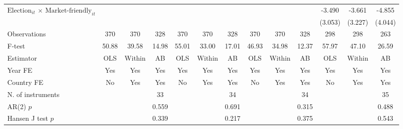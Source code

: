 \begin{longtable}{m{4.5cm}*{12}{c}}
\multirow{2}{4.5cm}{$\text{Election}_{it}$ $\times$ $\text{Market-friendly}_{it}$}&               &               &               &               &               &               &               &               &               &      -3.490   &      -3.661   &      -4.855   \\
                    &               &               &               &               &               &               &               &               &               &     (3.053)   &     (3.227)   &     (4.044)   \\
\midrule
Observations        &         370   &         370   &         328   &         370   &         370   &         328   &         370   &         370   &         328   &         298   &         298   &         263   \\
F-test              &       50.88   &       39.58   &       14.98   &       55.01   &       33.00   &       17.01   &       46.93   &       34.98   &       12.37   &       57.97   &       47.10   &       26.59   \\
Estimator           &         OLS   &      Within   &          AB   &         OLS   &      Within   &          AB   &         OLS   &      Within   &          AB   &         OLS   &      Within   &          AB   \\
Year FE             &         Yes   &         Yes   &         Yes   &         Yes   &         Yes   &         Yes   &         Yes   &         Yes   &         Yes   &         Yes   &         Yes   &         Yes   \\
Country FE          &          No   &         Yes   &         Yes   &          No   &         Yes   &         Yes   &          No   &         Yes   &         Yes   &          No   &         Yes   &         Yes   \\
N. of instruments   &               &               &          33   &               &               &          34   &               &               &          34   &               &               &          35   \\
AR(2) \(p\)         &               &               &       0.559   &               &               &       0.691   &               &               &       0.315   &               &               &       0.488   \\
Hansen J test \(p\) &               &               &       0.339   &               &               &       0.217   &               &               &       0.375   &               &               &       0.543   \\

\end{longtable}
